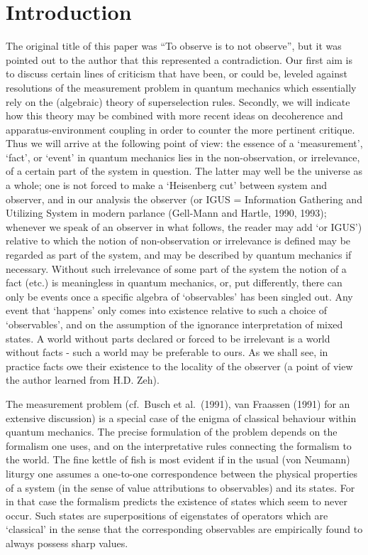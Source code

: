 \section{Introduction}
The original title of this paper was ``To observe is to not observe'', but it
was pointed out to the
author that this represented a contradiction.  Our first aim  is to discuss
certain lines
of criticism that have been, or could be, leveled against  resolutions of the
measurement problem in
quantum mechanics which essentially rely on the (algebraic) theory of
superselection rules. Secondly,
we will indicate how this theory may be combined with more recent ideas on
decoherence and
apparatus-environment coupling in order to    counter the more  pertinent
critique.  Thus we will
arrive at the following  point of view: the essence of a   `measurement',
`fact', or `event' in
quantum mechanics lies in the   non-observation, or irrelevance, of a certain
part of the system in
question. The latter may well be the universe as a whole; one is not forced to
make a `Heisenberg
cut' between system and observer, and in our analysis the observer (or IGUS =
Information Gathering
and Utilizing System in modern parlance  (Gell-Mann and Hartle, 1990, 1993);
whenever we speak of an
observer in what follows, the reader may add `or IGUS') relative to which the
notion of
non-observation or irrelevance is defined may be regarded as part of the
system, and may be described
by quantum mechanics if necessary. Without such irrelevance of some part of the
system the notion of
a fact (etc.) is meaningless in quantum mechanics, or, put differently, there
can only be events once
a specific algebra of `observables' has been singled out. Any event that
`happens' only comes into
existence relative to such a choice of `observables', and on the assumption of
the ignorance
interpretation of mixed states.   A world without parts declared or forced to
be irrelevant is a
world without facts - such a world may be preferable to ours. As we shall see,
in practice facts owe
their existence to the locality of the observer (a point of view the author
learned from H.D. Zeh).

The measurement problem  (cf.\   Busch et al.\ (1991), van Fraassen (1991) for
an extensive
discussion) is a special case of the enigma of classical behaviour within
quantum mechanics. The precise formulation of the problem depends on the
formalism one uses, and on
the interpretative rules connecting the formalism to the world. The fine kettle
of fish is most
evident if in the usual (von Neumann) liturgy one assumes a one-to-one
correspondence between the
physical properties of a system (in the sense of value attributions to
observables) and its states.
For in that case the formalism predicts the existence of states which seem to
never occur.
Such states are superpositions of eigenstates of  operators which are
`classical' in the sense that
the corresponding observables are empirically found to  always possess sharp
values.

